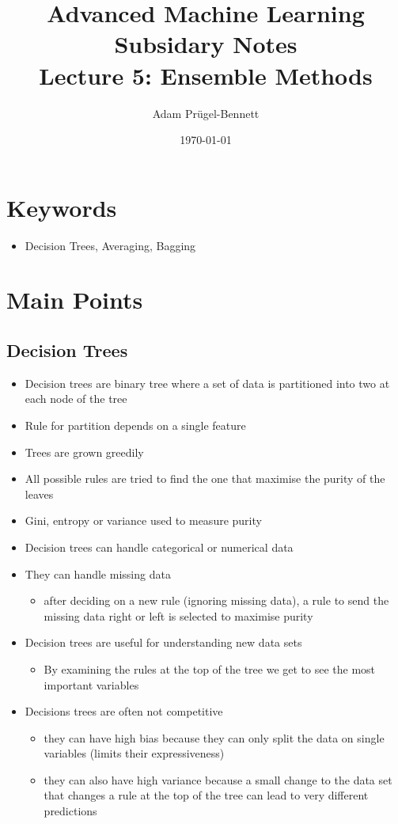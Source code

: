 \documentclass[11pt]{article}
\author{Adam Prügel-Bennett}
\date{\today}
\title{Advanced Machine Learning Subsidary Notes\\\medskip
\large Lecture 5: Ensemble Methods}
\begin{document}
\maketitle

\section{Keywords}
\label{sec:org83d2245}
\begin{itemize}
\item Decision Trees, Averaging, Bagging
\end{itemize}

\section{Main Points}
\label{sec:org0bbc1a3}

\subsection{Decision Trees}
\label{sec:org6c88125}
\begin{itemize}
\item Decision trees are binary tree where a set of data is
partitioned into two at each node of the tree
\item Rule for partition depends on a single feature
\item Trees are grown greedily
\item All possible rules are tried to find the one that maximise the
purity of the leaves
\item Gini, entropy or variance used to measure purity
\item Decision trees can handle categorical or numerical data
\item They can handle missing data
\begin{itemize}
\item after deciding on a new rule (ignoring missing data), a
rule to send the missing data right or left is selected to
maximise purity
\end{itemize}
\item Decision trees are useful for understanding new data sets
\begin{itemize}
\item By examining the rules at the top of the tree we get to see
the most important variables
\end{itemize}
\item Decisions trees are often not competitive
\begin{itemize}
\item they can have high bias because they can only split the data
on single variables (limits their expressiveness)
\item they can also have high variance because a small change to the
data set that changes a rule at the top of the tree can lead
to very different predictions
\end{itemize}
\end{itemize}
\end{document}
